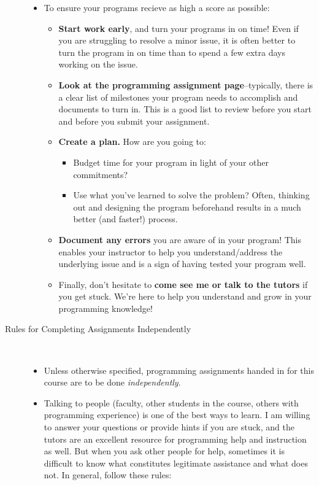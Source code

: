\documentclass [letterpaper,11pt]{article}
\begin{document}
\begin{description}
\begin{itemize}
\item To ensure your programs recieve as high a score as possible:
	\begin{itemize}
	\item  \textbf{Start work early}, and turn your programs in on time!  Even if you are struggling to resolve a minor issue, it is often better to turn the program in on time than to spend a few extra days working on the issue.
	\item 	\textbf{Look at the programming assignment page}--typically, there is a clear list of milestones your program needs to accomplish and documents to turn in.  This is a good list to review before you start and before you submit your assignment.
	\item  \textbf{Create a plan.} How are you going to:
\begin{itemize}
\item Budget time for your program in light of your other commitments?
\item Use what you've learned to solve the problem?  Often, thinking out and designing the program beforehand results in a much better (and faster!) process.
\end{itemize}
	\item	\textbf{Document any errors} you are aware of in your program!  This enables your instructor to help you understand/address the underlying issue and is a sign of having tested your program well.
\item 	Finally, don't hesitate to \textbf{come see me or talk to the tutors} if you get stuck. We're here to help you understand and grow in your programming knowledge!
\end{itemize}
\end{itemize}

\item[Rules for Completing Assignments Independently]\
\begin{itemize}
        \item Unless otherwise specified, programming assignments handed in for this course are to be done \emph{independently}.  
        \item Talking to people (faculty, other students in the course, others with programming experience) is one of the best ways to learn.  I am willing to answer your questions or provide hints if you are stuck, and the tutors are an excellent resource for programming help and instruction as well.  But when you ask other people for help, sometimes
        it is difficult to know what constitutes legitimate assistance and what does not.  In general, follow these rules:
        

\end{itemize}
\end{description}
\end{document}
